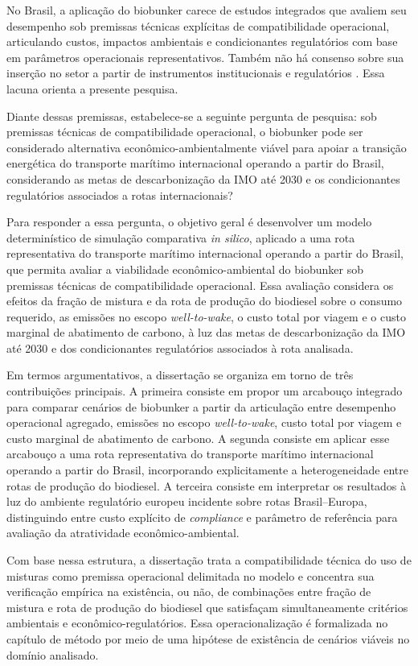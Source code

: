 No Brasil, a aplicação do biobunker carece de estudos integrados que avaliem seu desempenho sob premissas técnicas explícitas de compatibilidade operacional, articulando custos, impactos ambientais e condicionantes regulatórios com base em parâmetros operacionais representativos. Também não há consenso sobre sua inserção no setor a partir de instrumentos institucionais e regulatórios \citep{carvalho_biofuels_2021}. Essa lacuna orienta a presente pesquisa.

Diante dessas premissas, estabelece-se a seguinte pergunta de pesquisa: sob premissas técnicas de compatibilidade operacional, o biobunker pode ser considerado alternativa econômico-ambientalmente viável para apoiar a transição energética do transporte marítimo internacional operando a partir do Brasil, considerando as metas de descarbonização da \gls{IMO} até 2030 e os condicionantes regulatórios associados a rotas internacionais?

Para responder a essa pergunta, o objetivo geral é desenvolver um modelo determinístico de simulação comparativa \emph{in silico}, aplicado a uma rota representativa do transporte marítimo internacional operando a partir do Brasil, que permita avaliar a viabilidade econômico-ambiental do biobunker sob premissas técnicas de compatibilidade operacional. Essa avaliação considera os efeitos da fração de mistura e da rota de produção do biodiesel sobre o consumo requerido, as emissões no escopo \emph{well-to-wake}, o custo total por viagem e o custo marginal de abatimento de carbono, à luz das metas de descarbonização da \gls{IMO} até 2030 e dos condicionantes regulatórios associados à rota analisada.

Em termos argumentativos, a dissertação se organiza em torno de três contribuições principais. A primeira consiste em propor um arcabouço integrado para comparar cenários de biobunker a partir da articulação entre desempenho operacional agregado, emissões no escopo \emph{well-to-wake}, custo total por viagem e custo marginal de abatimento de carbono. A segunda consiste em aplicar esse arcabouço a uma rota representativa do transporte marítimo internacional operando a partir do Brasil, incorporando explicitamente a heterogeneidade entre rotas de produção do biodiesel. A terceira consiste em interpretar os resultados à luz do ambiente regulatório europeu incidente sobre rotas Brasil--Europa, distinguindo entre custo explícito de \emph{compliance} e parâmetro de referência para avaliação da atratividade econômico-ambiental.

Com base nessa estrutura, a dissertação trata a compatibilidade técnica do uso de misturas como premissa operacional delimitada no modelo e concentra sua verificação empírica na existência, ou não, de combinações entre fração de mistura e rota de produção do biodiesel que satisfaçam simultaneamente critérios ambientais e econômico-regulatórios. Essa operacionalização é formalizada no capítulo de método por meio de uma hipótese de existência de cenários viáveis no domínio analisado.

